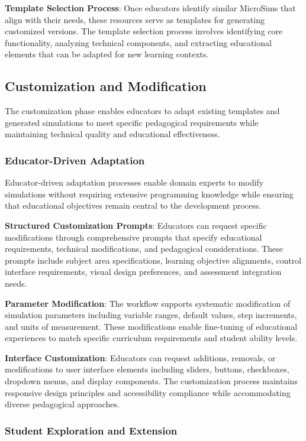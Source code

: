 \textbf{Template Selection Process}: Once educators identify similar MicroSims that align with their needs, these resources serve as templates for generating customized versions. The template selection process involves identifying core functionality, analyzing technical components, and extracting educational elements that can be adapted for new learning contexts.

\subsection{Customization and Modification}

The customization phase enables educators to adapt existing templates and generated simulations to meet specific pedagogical requirements while maintaining technical quality and educational effectiveness.

\subsubsection{Educator-Driven Adaptation}

Educator-driven adaptation processes enable domain experts to modify simulations without requiring extensive programming knowledge while ensuring that educational objectives remain central to the development process.

\textbf{Structured Customization Prompts}: Educators can request specific modifications through comprehensive prompts that specify educational requirements, technical modifications, and pedagogical considerations. These prompts include subject area specifications, learning objective alignments, control interface requirements, visual design preferences, and assessment integration needs.

\textbf{Parameter Modification}: The workflow supports systematic modification of simulation parameters including variable ranges, default values, step increments, and units of measurement. These modifications enable fine-tuning of educational experiences to match specific curriculum requirements and student ability levels.

\textbf{Interface Customization}: Educators can request additions, removals, or modifications to user interface elements including sliders, buttons, checkboxes, dropdown menus, and display components. The customization process maintains responsive design principles and accessibility compliance while accommodating diverse pedagogical approaches.

\subsubsection{Student Exploration and Extension}

